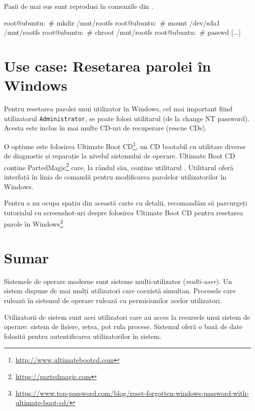 Pașii de mai sus sunt reproduși în comenzile din .

\begin{screen}[caption={Resetarea parolei contului root cu live CD},label={lst:user:pw-reset-live-cd}]
root@ubuntu:~# mkdir /mnt/rootfs
root@ubuntu:~# mount /dev/sda1 /mnt/rootfs
root@ubuntu:~# chroot /mnt/rootfs
root@ubuntu:~# passwd
[...]
\end{screen}

\section{Use case: Resetarea parolei în Windows}
\label{sec:user:windows-password-recovery}

Pentru resetarea parolei unui utilizator în Windows, cel mai important fiind utilizatorul \texttt{Administrator}, se poate folosi utilitarul  (de la change NT password).
Acesta este inclus în mai multe CD-uri de recuperare (rescue CDs).

O opțiune este folosirea Ultimate Boot CD\footnote{\url{http://www.ultimatebootcd.com}}, un CD bootabil cu utilitare diverse de diagnostic și reparație la nivelul sistemului de operare.
Ultimate Boot CD conține PartedMagic\footnote{\url{https://partedmagic.com}} care, la rândul său, conține utilitarul .
Utilitarul  oferă interfață în linia de comandă pentru modificarea parolelor utilizatorilor în Windows.

Pentru a nu ocupa spațiu din această carte cu detalii, recomandăm să parcurgeți tutorialul cu screenshot-uri despre folosirea Ultimate Boot CD pentru resetarea parole în Windows\footnote{\url{https://www.top-password.com/blog/reset-forgotten-windows-password-with-ultimate-boot-cd/}}.

\section{Sumar}
\label{sec:user:summary}

Sistemele de operare moderne sunt sisteme multi-utilizator (\textit{multi-user}).
Un sistem dispune de mai mulți utilizatori care coexistă simultan.
Procesele care rulează în sistemul de operare rulează cu permisiunilor acelor utilizatori.

Utilizatorii de sistem sunt acei utilizatori care au acces la resursele unui sistem de operare: sistem de fișiere, rețea, pot rula procese.
Sistemul oferă o bază de date folosită pentru autentificarea utilizatorilor în sistem.

